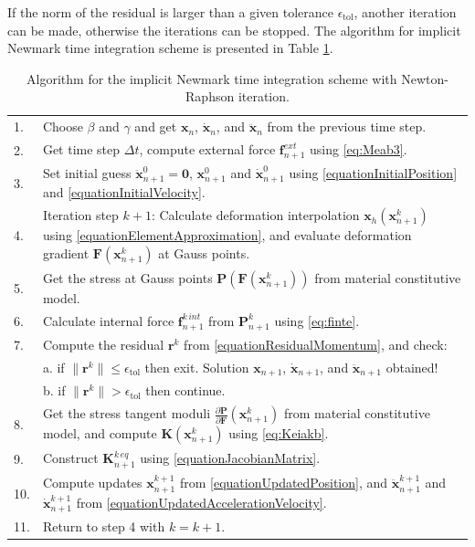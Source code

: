 \documentclass[oneside,11pt,times]{book}
\begin{document}
If the norm of the residual is larger than a given tolerance $\epsilon_{\textrm{tol}}$, another iteration can be made, otherwise the iterations can be stopped. The algorithm for implicit Newmark time integration scheme is presented in Table \ref{tableNewmarkAlgorithm}.
%
\begin{table}[h]
 \caption{Algorithm for the implicit Newmark time integration scheme with Newton-Raphson iteration.}
 \label{tableNewmarkAlgorithm}
 \begin{tabular}{|p{5mm} p{118mm}|}
 \hline
 1. & Choose $\beta$ and $\gamma$ and get $\bm{x}_{n}$, $\dot{\bm{x}}_{n}$, and
   $\ddot{\bm{x}}_{n}$ from the previous time step. \\
 2. & Get time step $\Delta t$, compute external force $\bm{f}^{ext}_{n+1}$ using
   \eqref{eq:Meab3}. \\
 3. & Set initial guess $\ddot{\bm{x}}^{0}_{n+1} = \bm{0}$, $\bm{x}^{0}_{n+1}$ and
   $\dot{\bm{x}}^{0}_{n+1}$ using \eqref{equationInitialPosition} and \eqref{equationInitialVelocity}. \\
 4. & Iteration step $k+1$: Calculate deformation interpolation $\bm{x}_{h}(\bm{x}^{k}_{n+1})$ using
   \eqref{equationElementApproximation}, and evaluate deformation gradient $\bm{F} (\bm{x}^{k}_{n+1})$ at Gauss points. \\
 5. & Get the stress at Gauss points $\bm{P}(\bm{F}(\bm{x}^{k}_{n+1}))$ from material constitutive model. \\
 6. & Calculate internal force $\bm{f}^{k\,int}_{n+1}$ from $\bm{P}_{n+1}^{k}$ using
   \eqref{eq:finte}. \\
 7. & Compute the residual $\bm{r}^{k}$ from \eqref{equationResidualMomentum}, and check: \\
    & a. if $\|\bm{r}^{k}\| \le \epsilon_{\textrm{tol}}$ then exit. Solution  $\bm{x}_{n+1}$,
      $\dot{\bm{x}}_{n+1}$, and $\ddot{\bm{x}}_{n+1}$ obtained! \\
    & b. if $\|\bm{r}^{k}\| > \epsilon_{\textrm{tol}}$ then continue.  \\
 8. & Get the stress tangent moduli $\frac{\partial \bm{P}}{\partial \bm{F}}(\bm{x}^{k}_{n+1})$ from material constitutive model,
   and compute $\bm{K}(\bm{x}_{n+1}^{k})$ using \eqref{eq:Keiakb}. \\
 9. & Construct $\bm{K}^{k\,eq}_{n+1}$ using \eqref{equationJacobianMatrix}. \\
 10. & Compute updates $\bm{x}^{k+1}_{n+1}$ from \eqref{equationUpdatedPosition}, and
   $\ddot{\bm{x}}^{k+1}_{n+1}$ and $\dot{\bm{x}}^{k+1}_{n+1}$ from
   \eqref{equationUpdatedAccelerationVelocity}. \\
 11. & Return to step 4 with $k = k+1$. \\
 \hline
 \end{tabular}
\end{table}
\end{document}
